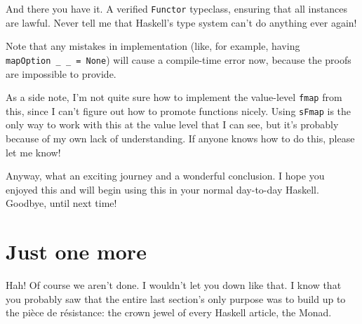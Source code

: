 \documentclass[]{article}
\begin{document}
And there you have it. A verified \texttt{Functor} typeclass, ensuring that all
instances are lawful. Never tell me that Haskell's type system can't do anything
ever again!

Note that any mistakes in implementation (like, for example, having
\texttt{mapOption\ \_\ \_\ =\ None}) will cause a compile-time error now,
because the proofs are impossible to provide.

As a side note, I'm not quite sure how to implement the value-level
\texttt{fmap} from this, since I can't figure out how to promote functions
nicely. Using \texttt{sFmap} is the only way to work with this at the value
level that I can see, but it's probably because of my own lack of understanding.
If anyone knows how to do this, please let me know!

Anyway, what an exciting journey and a wonderful conclusion. I hope you enjoyed
this and will begin using this in your normal day-to-day Haskell. Goodbye, until
next time!

\section{Just one more}\label{just-one-more}

Hah! Of course we aren't done. I wouldn't let you down like that. I know that
you probably saw that the entire last section's only purpose was to build up to
the pièce de résistance: the crown jewel of every Haskell article, the Monad.
\end{document}
